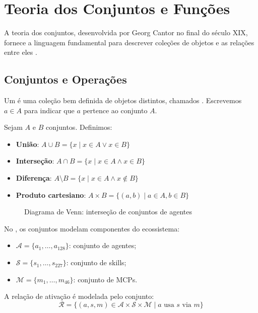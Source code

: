 \section{Teoria dos Conjuntos e Funções}
\label{sec:teoria-conjuntos}
\nivelbasico
A teoria dos conjuntos, desenvolvida por Georg Cantor no final do século XIX,
fornece a linguagem fundamental para descrever coleções de objetos e as
relações entre eles \cite{hastie2009elements, wasserman2004all}.
\subsection{Conjuntos e Operações}
\begin{definicao}[Conjunto]
Um  é uma coleção bem definida de objetos distintos,
chamados . Escrevemos $a \in A$ para indicar que
$a$ pertence ao conjunto $A$.
\end{definicao}
\begin{definicao}
Sejam $A$ e $B$ conjuntos. Definimos:
\begin{itemize}
\item \textbf{União}: $A \cup B = \{x \mid x \in A \lor x \in B\}$
\item \textbf{Interseção}: $A \cap B = \{x \mid x \in A \land x \in B\}$
\item \textbf{Diferença}: $A \setminus B = \{x \mid x \in A \land x \notin B\}$
\item \textbf{Produto cartesiano}: $A \times B = \{(a,b) \mid a \in A, b \in B\}$
\end{itemize}
\end{definicao}
\begin{figure}[htb]
\centrifugo
\caption{Diagrama de Venn: interseção de conjuntos de agentes}
\label{fig:venn-agentes}
\end{figure}
\begin{exemplo}
No \opencodeeco, os conjuntos modelam componentes do ecossistema:
\begin{itemize}
\item $\mathcal{A} = \{a_1, \ldots, a_{128}\}$: conjunto de agentes;
\item $\mathcal{S} = \{s_1, \ldots, s_{227}\}$: conjunto de skills;
\item $\mathcal{M} = \{m_1, \ldots, m_{46}\}$: conjunto de MCPs.
\end{itemize}
A relação de ativação é modelada pelo conjunto:
\[\mathcal{R} = \{(a, s, m) \in \mathcal{A} \times \mathcal{S} \times
\mathcal{M} \mid a \text{ usa } s \text{ via } m\}
\]
\end{exemplo}
